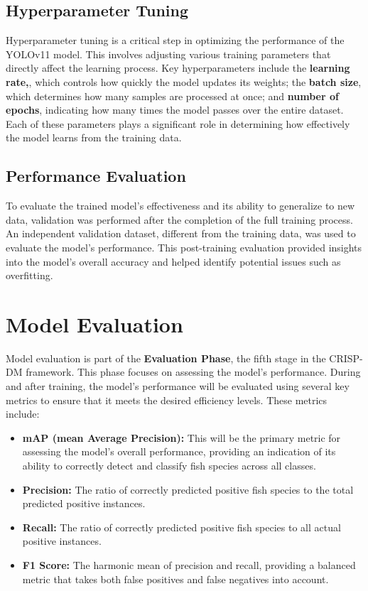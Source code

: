 \subsection{Hyperparameter Tuning}
Hyperparameter tuning is a critical step in optimizing the performance of the YOLOv11 model. This involves adjusting various training parameters that directly affect the learning process. Key hyperparameters include the \textbf{learning rate,}, which controls how quickly the model updates its weights; the \textbf{batch size}, which determines how many samples are processed at once; and \textbf{number of epochs}, indicating how many times the model passes over the entire dataset. Each of these parameters plays a significant role in determining how effectively the model learns from the training data.

\subsection{Performance Evaluation}
To evaluate the trained model's effectiveness and its ability to generalize to new data, validation was performed after the completion of the full training process. An independent validation dataset, different from the training data, was used to evaluate the model's performance. This post-training evaluation provided insights into the model's overall accuracy and helped identify potential issues such as overfitting.


\section{Model Evaluation}
Model evaluation is part of the \textbf{Evaluation Phase}, the fifth stage in the CRISP-DM framework. This phase focuses on assessing the model’s performance. During and after training, the model’s performance will be evaluated using several key metrics to ensure that it meets the desired efficiency levels. These metrics include:


\begin{itemize}
\item \textbf{mAP (mean Average Precision):} This will be the primary metric for assessing the model’s overall performance, providing an indication of its ability to correctly detect and classify fish species across all classes.
\item \textbf{Precision:} The ratio of correctly predicted positive fish species to the total predicted positive instances.
\item \textbf{Recall:} The ratio of correctly predicted positive fish species to all actual positive instances.
\item \textbf{F1 Score:} The harmonic mean of precision and recall, providing a balanced metric that takes both false positives and false negatives into account.
\end{itemize}


